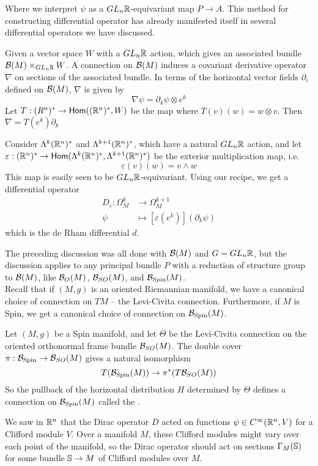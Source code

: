 Where we interpret $\psi$ as a $GL_n\R$-equivariant map $P \to A$.
%
This method for constructing differential operator has already manifested itself
in several differential operators we have discussed.
%
\begin{exmp}
 Given a vector space $W$ with a $GL_n\R$ action, which gives an associated
 bundle $\B(M) \times_{GL_n\R} W$. A connection on $\B(M)$ induces a
 covariant derivative operator $\nabla$ on sections of the associated bundle.
 In terms of the horizontal vector
 fields $\partial_i$ defined on $\B(M)$, $\nabla$ is given by
 \[
  \nabla\psi = \partial_k\psi \otimes e^k
 \]
 Let $T : (R^n)^* \to \hom((\R^n)^*, W)$ be the map where $T(v)(w) = w \otimes v$.
 Then $\nabla = T(e^k)\partial_k$
\end{exmp}
%
\begin{exmp}
 Consider $\Lambda^k(\R^n)^*$ and $\Lambda^{k+1}(\R^n)^*$, which have a natural
 $GL_n\R$ action, and let
 $\varepsilon : (\R^n)^* \to \hom(\Lambda^k(\R^n)^*,\Lambda^{k+1}(\R^n)^*)$
 be the exterior multiplication map, i.e.
 \[
  \varepsilon(v)(w) = v \wedge w
 \]
 This map is easily seen to be $GL_n\R$-equivariant. Using our recipe, we get a
 differential operator
 \begin{align*}
  D_\varepsilon : \Omega^k_M & \to \Omega^{k+1}_M                         \\
  \psi                       & \mapsto [\varepsilon(e^k)](\partial_k\psi)
 \end{align*}
 which is the de Rham differential $d$.
\end{exmp}
%
The preceding discussion was all done with $\B(M)$ and $G = GL_n\R$, but the
discussion applies to any principal bundle $P$ with a reduction of structure
group to $\B(M)$, like $\B_O(M)$, $\B_{SO}(M)$, and $\B_{\Spin}(M)$. \\
%

Recall that if $(M,g)$ is an oriented Riemannian manifold, we have a canonical
choice of connection on $TM$ -- the Levi-Civita connection. Furthermore, if $M$ is Spin,
we get a canonical choice of connection on $\B_{\Spin}(M)$.
%
\begin{defn}
 Let $(M,g)$ be a Spin manifold, and let $\Theta$ be the Levi-Civita connection
 on the oriented orthonormal frame bundle $\B_{SO}(M)$. The double cover
 $\pi : \B_{\Spin} \to \B_{SO}(M)$ gives a natural isomorphism
 \[
  T(\B_{\Spin}(M)) \to \pi^*(T\B_{SO}(M))
 \]
 So the pullback of the horizontal distribution $H$ determined by $\Theta$
 defines a connection on $\B_{\Spin}(M)$ called the .
\end{defn}
%
We saw in $\R^n$ that the Dirac operator $D$ acted on functions
$\psi \in C^\infty(\R^n, V)$ for a Clifford module $V$. Over a manifold $M$,
these Clifford modules might vary over each point of the manifold, so the
Dirac operator should act on sections $\Gamma_M(\S)$ for some bundle $\S \to M$
of Clifford modules over $M$. \\
%

